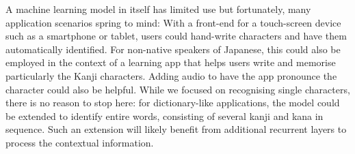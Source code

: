 \documentclass[british,12p]{article}
\begin{document}
    A machine learning model in itself has limited use but fortunately, many application scenarios spring to mind:
    With a front-end for a touch-screen device such as a smartphone or tablet, users could hand-write characters and have them automatically identified.  For non-native speakers of Japanese, this could also be employed in the context of a learning app that helps users write and memorise particularly the Kanji characters. Adding audio to have the app pronounce the character could also be helpful. While we focused on recognising single characters, there is no reason to stop here: for dictionary-like applications, the model could be extended to identify entire words, consisting of several kanji and kana in sequence. Such an extension will likely benefit from additional recurrent layers to process the contextual information. 
           
            
      \printbibliography
    
\end{document}
